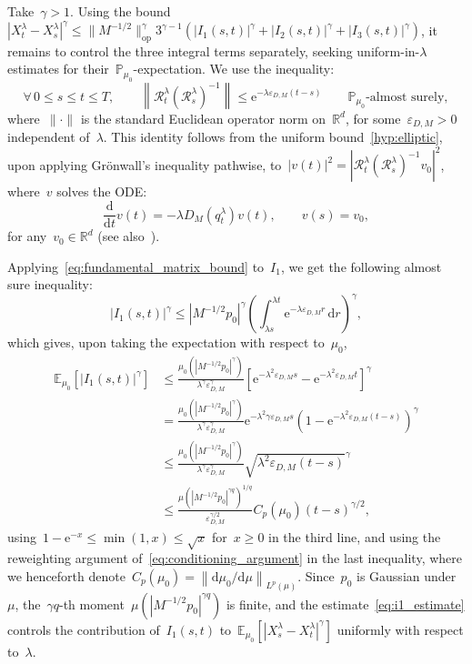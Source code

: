 \documentclass[10pt]{article}
\newcommand{\cR}{\mathcal{R}}
\renewcommand{\d}{\mathrm{d}}
\newcommand{\e}{\mathrm{e}}
\newcommand{\E}{\mathbb{E}}
\renewcommand{\P}{\mathbb{P}}
\newcommand{\R}{\mathbb{R}}
\newcommand{\1}{\mathbbm 1}
\begin{document}
Take~$\gamma> 1$. Using the bound~$|X_t^\lambda-X_s^\lambda|^\gamma\leq \|M^{-1/2}\|_{\mathrm{op}}^\gamma 3^{\gamma-1}(|I_1(s,t)|^\gamma + |I_2(s,t)|^\gamma + |I_3(s,t)|^\gamma)$, it remains to control the three integral terms separately, seeking uniform-in-$\lambda$ estimates for their~$\P_{\mu_0}$-expectation.
We use the inequality:
\begin{equation}
    \label{eq:fundamental_matrix_bound}
    \forall\,0\leq s\leq t\leq T,\qquad \left\|\cR_t^\lambda\left(\cR_{s}^\lambda\right)^{-1}\right\|\leq \e^{-\lambda\varepsilon_{D,M}(t-s)}\qquad \P_{\mu_0}\text{-almost surely},
\end{equation}
where~$\|\cdot\|$ is the standard Euclidean operator norm on~$\R^d$, for some~$\varepsilon_{D,M}>0$ independent of~$\lambda$.
This identity follows from the uniform bound~\eqref{hyp:elliptic}, upon applying Gr\"onwall's inequality pathwise, to~$|v(t)|^2 = \left|\cR_t^\lambda (\cR_s^\lambda)^{-1}v_0\right|^2$, where~$v$ solves the ODE:
\begin{equation}
\frac{\d}{\d t}v(t) = -\lambda D_M (q_t^\lambda)v(t),\qquad v(s) = v_0,
\end{equation}
for any~$v_0\in\R^d$ (see also~\cite[Problem 3.31]{T00}).

Applying~\eqref{eq:fundamental_matrix_bound} to~$I_1$, we get the following almost sure inequality:
\begin{equation}
    \left|I_1(s,t)\right|^\gamma \leq |M^{-1/2}p_0|^\gamma\left(\int_{\lambda s}^{\lambda t} \e^{-\lambda\varepsilon_{D,M} r}\,\d r\right)^\gamma,
\end{equation}
which gives, upon taking the expectation with respect to~$\mu_0$,
\begin{equation}
    \label{eq:i1_estimate}
    \begin{aligned}
    \E_{\mu_0}\left[\left|I_1(s,t)\right|^\gamma\right] &\leq\frac{\mu_0(|M^{-1/2}p_0|^\gamma)}{\lambda^\gamma \varepsilon_{D,M}^\gamma}[\e^{-\lambda^2\varepsilon_{D,M} s}-\e^{-\lambda^2\varepsilon_{D,M} t}]^\gamma\\
    &= \frac{\mu_0(|M^{-1/2}p_0|^\gamma)}{\lambda^\gamma \varepsilon_{D,M}^\gamma} \e^{-\lambda^2\gamma \varepsilon_{D,M} s}\left(1-\e^{-\lambda^2\varepsilon_{D,M}(t-s)}\right)^\gamma \\
    &\leq \frac{\mu_0(|M^{-1/2}p_0|^\gamma)}{\lambda^\gamma \varepsilon_{D,M}^\gamma} \sqrt{\lambda^2\varepsilon_{D,M}(t-s)}^\gamma \\
    &\leq \frac{\mu(|M^{-1/2} p_0|^{\gamma q})^{1/q}}{\varepsilon_{D,M}^{\gamma/2}}C_p(\mu_0)(t-s)^{\gamma/2},
    \end{aligned}
\end{equation}
using~$1-\e^{-x}\leq \min(1,x)\leq \sqrt x$ for~$x\geq 0$ in the third line, and using the reweighting argument of~\eqref{eq:conditioning_argument} in the last inequality, where we henceforth denote~${C_p(\mu_0) = \left\|\d\mu_0/\d\mu\right\|_{L^p(\mu)}}$. Since~$p_0$ is Gaussian under~$\mu$, the~$\gamma q$-th moment~$\mu(|M^{-1/2}p_0|^{\gamma q})$ is finite, and the estimate~\eqref{eq:i1_estimate} controls the contribution of~$I_1(s,t)$ to~$\E_{\mu_0}[|X_s^\lambda-X_t^\lambda|^\gamma]$ uniformly with respect to~$\lambda$.
\end{document}
